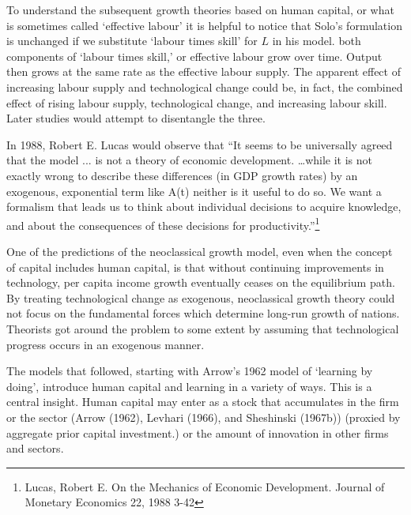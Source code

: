 To understand the subsequent growth theories based on human capital, or what is sometimes called `effective labour' it is helpful to notice that Solo's formulation is unchanged if we substitute `labour times  skill' for $L$ in his model. both components of `labour times  skill,' or effective labour grow over time. Output then grows at the same rate as the effective labour supply. The apparent effect of increasing labour supply and technological change could be, in fact, the combined effect of rising labour supply, technological change, and increasing labour skill. Later studies would attempt to disentangle the three.


In 1988, Robert E. Lucas would observe that ``It seems to be universally agreed that the model ... is not a theory of economic development.   \dots while it is not exactly wrong to describe these differences (in GDP  growth rates) by an exogenous, exponential term like A(t) neither is it useful to do so. We want a formalism that leads us to think about individual decisions to acquire knowledge, and about the consequences of these decisions for productivity.''\footnote{Lucas,  Robert E. On the Mechanics of Economic Development. Journal of Monetary Economics 22, 1988 3-42} 




One of the predictions of the neoclassical growth model, even  when the concept of capital includes human capital, is that without  continuing improvements in technology, per capita income growth eventually ceases on the equilibrium path. 
By treating technological change as exogenous, neoclassical growth theory could not focus on the fundamental forces which determine long-run growth of nations. Theorists got around the problem to some extent by assuming that technological progress occurs in an exogenous manner. 

The models that followed, starting with Arrow's 1962 model of `learning by doing', introduce human capital and learning in a variety of ways. This is a central insight. Human capital may enter  as a stock that accumulates in the firm or the sector (Arrow (1962), Levhari (1966), and Sheshinski (1967b)) (proxied by aggregate prior capital investment.)
or the amount of innovation in other firms and sectors. %


